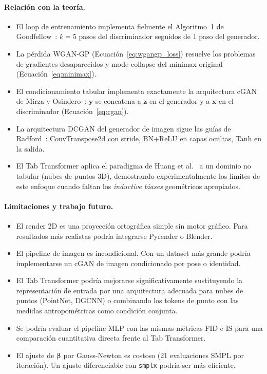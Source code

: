 \documentclass[a4paper,11pt]{article}
\begin{document}
\paragraph{Relación con la teoría.}
\begin{itemize}
    \item El loop de entrenamiento implementa fielmente el Algoritmo~1 de
          Goodfellow~\cite{goodfellow2014}: $k=5$ pasos del discriminador
          seguidos de 1 paso del generador.
    \item La pérdida WGAN-GP (Ecuación~\ref{eq:wgangp_loss}) resuelve los
          problemas de gradientes desaparecidos y mode collapse del minimax
          original (Ecuación~\ref{eq:minimax}).
    \item El condicionamiento tabular implementa exactamente la arquitectura
          cGAN de Mirza y Osindero~\cite{mirza2014}: $\bm{y}$ se concatena a
          $\bm{z}$ en el generador y a $\bm{x}$ en el discriminador
          (Ecuación~\ref{eq:cgan}).
    \item La arquitectura DCGAN del generador de imagen sigue las guías de
          Radford~\cite{radford2015}: ConvTranspose2d con stride,
          BN+ReLU en capas ocultas, Tanh en la salida.
    \item El Tab Transformer aplica el paradigma de Huang et
          al.~\cite{huang2020} a un dominio no tabular (nubes de puntos 3D),
          demostrando experimentalmente los límites de este enfoque cuando
          faltan los \emph{inductive biases} geométricos apropiados.
\end{itemize}

\paragraph{Limitaciones y trabajo futuro.}
\begin{itemize}
    \item El render 2D es una proyección ortográfica simple sin motor gráfico.
          Para resultados más realistas podría integrarse Pyrender o Blender.
    \item El pipeline de imagen es incondicional. Con un dataset más grande
          podría implementarse un cGAN de imagen condicionado por pose o
          identidad.
    \item El Tab Transformer podría mejorarse significativamente sustituyendo
          la representación de entrada por una arquitectura adecuada para
          nubes de puntos (PointNet, DGCNN) o combinando los tokens de punto
          con las medidas antropométricas como condición conjunta.
    \item Se podría evaluar el pipeline MLP con las mismas métricas FID e IS
          para una comparación cuantitativa directa frente al Tab Transformer.
    \item El ajuste de $\bm{\beta}$ por Gauss-Newton es costoso (21 evaluaciones
          SMPL por iteración). Un ajuste diferenciable con \texttt{smplx} podría
          ser más eficiente.
\end{itemize}

\newpage
\printbibliography[title={Referencias}]
\end{document}
